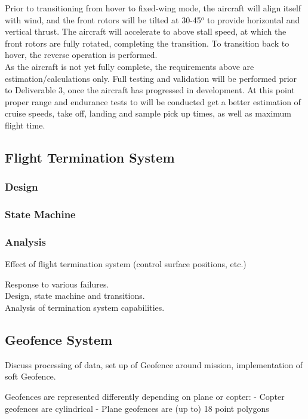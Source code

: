 Prior to transitioning from hover to fixed-wing mode, the aircraft will align itself with wind, and the front rotors will be tilted at 30-45$^o$ to provide horizontal and vertical thrust. The aircraft will accelerate to above stall speed, at which the front rotors are fully rotated, completing the transition. To transition back to hover, the reverse operation is performed.\\

As the aircraft is not yet fully complete, the requirements above are estimation/calculations only. Full testing and validation will be performed prior to Deliverable 3, once the aircraft has progressed in development. At this point proper range and endurance tests to will be conducted get a better estimation of cruise speeds, take off, landing and sample pick up times, as well as maximum flight time.

\subsection{Flight Termination System}
\subsubsection{Design}

\subsubsection{State Machine}

\subsubsection{Analysis}
Effect of flight termination system (control surface positions, etc.)

Response to various failures.\\

Design, state machine and transitions.\\

Analysis of termination system capabilities.

\subsection{Geofence System}
Discuss processing of data, set up of Geofence around mission, implementation of soft Geofence.

Geofences are represented differently depending on plane or copter:
- Copter geofences are cylindrical
- Plane geofences are (up to) 18 point polygons

